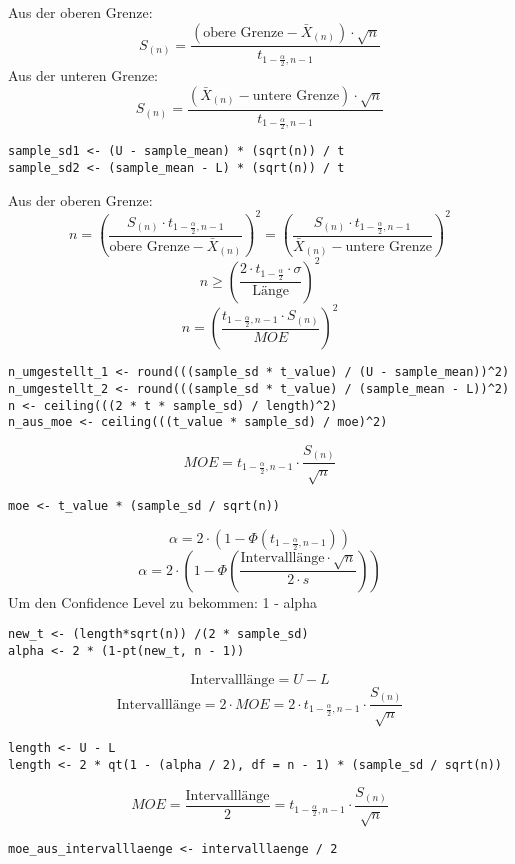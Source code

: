 \begin{multicols*}{2}

Aus der oberen Grenze:
$$
S_{(n)} = \frac{\left( \text{obere Grenze} - \bar{X}_{(n)} \right) \cdot \sqrt{n}}{t_{1 - \frac{\alpha}{2}, n-1}}
$$
Aus der unteren Grenze:
$$
S_{(n)} = \frac{\left( \bar{X}_{(n)} - \text{untere Grenze} \right) \cdot \sqrt{n}}{t_{1 - \frac{\alpha}{2}, n-1}}
$$
\begin{lstlisting}
sample_sd1 <- (U - sample_mean) * (sqrt(n)) / t
sample_sd2 <- (sample_mean - L) * (sqrt(n)) / t
\end{lstlisting}


Aus der oberen Grenze:
$$
n = \left( \frac{S_{(n)} \cdot t_{1 - \frac{\alpha}{2}, n-1}}{\text{obere Grenze} - \bar{X}_{(n)}} \right)^2
=\left( \frac{S_{(n)} \cdot t_{1 - \frac{\alpha}{2}, n-1}}{\bar{X}_{(n)} - \text{untere Grenze}} \right)^2
$$
$$
n \geq \left( \frac{2 \cdot t_{1 - \frac{\alpha}{2}} \cdot \sigma}{\text{Länge}} \right)^2
$$
$$
n = \left( \frac{t_{1 - \frac{\alpha}{2}, n-1} \cdot S_{(n)}}{MOE} \right)^2
$$
\begin{lstlisting}
n_umgestellt_1 <- round(((sample_sd * t_value) / (U - sample_mean))^2)
n_umgestellt_2 <- round(((sample_sd * t_value) / (sample_mean - L))^2)
n <- ceiling(((2 * t * sample_sd) / length)^2)
n_aus_moe <- ceiling(((t_value * sample_sd) / moe)^2)
\end{lstlisting}

$$
MOE = t_{1 - \frac{\alpha}{2}, n-1} \cdot \frac{S_{(n)}}{\sqrt{n}}
$$
\begin{lstlisting}
moe <- t_value * (sample_sd / sqrt(n))
\end{lstlisting}
$$
\alpha = 2 \cdot \left( 1 - \Phi\left(t_{1 - \frac{\alpha}{2}, n-1}\right) \right)
$$
$$
\alpha = 2 \cdot \left( 1 - \Phi\left(\frac{\text{Intervalllänge} \cdot \sqrt{n}}{2 \cdot s}\right) \right)
$$
\textcolor{red}{\warning}Um den Confidence Level zu bekommen: 1 - alpha \textcolor{red}{\warning}
\begin{lstlisting}
new_t <- (length*sqrt(n)) /(2 * sample_sd)
alpha <- 2 * (1-pt(new_t, n - 1))
\end{lstlisting}

$$
\text{Intervalllänge} = U - L
$$
$$
\text{Intervalllänge} = 2 \cdot MOE = 2 \cdot t_{1 - \frac{\alpha}{2}, n-1} \cdot \frac{S_{(n)}}{\sqrt{n}}
$$
\begin{lstlisting}
length <- U - L
length <- 2 * qt(1 - (alpha / 2), df = n - 1) * (sample_sd / sqrt(n))
\end{lstlisting}

$$
MOE = \frac{\text{Intervalllänge}}{2} = t_{1 - \frac{\alpha}{2}, n-1} \cdot \frac{S_{(n)}}{\sqrt{n}}
$$
\begin{lstlisting}
moe_aus_intervalllaenge <- intervalllaenge / 2
\end{lstlisting}
\end{multicols*}